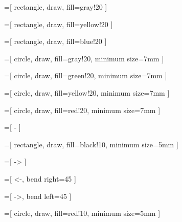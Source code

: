 
=[
	rectangle,
	draw,
	fill=gray!20
]

=[
	rectangle,
	draw,
	fill=yellow!20
]

=[
	rectangle,
	draw,
	fill=blue!20
]

=[
	circle,
	draw,
	fill=gray!20,
	minimum size=7mm
]

=[
	circle,
	draw,
	fill=green!20,
	minimum size=7mm
]

=[
	circle,
	draw,
	fill=yellow!20,
	minimum size=7mm
]

=[
	circle,
	draw,
	fill=red!20,
	minimum size=7mm
]

=[
	-
]

=[
	rectangle,
	draw,
	fill=black!10,
	minimum size=5mm
]

=[
	->
]

=[
	<-,
	bend right=45
]

=[
	->,
	bend left=45
]

=[
	circle,
	draw,
	fill=red!10,
	minimum size=5mm
]

\newcommand{\atomlegend}[2]{
	\node [rectangle,draw,fill=blue!20,minimum width=0.8cm] (body) at(#1,#2) {};
	\node [] (bodyLabel)							at(#1+1.4,#2)			{corps};
	\node [rectangle,draw,fill=yellow!20,minimum width=0.8cm] (head) at(#1,#2-0.5) {};
	\node [] (headLabel)							at(#1+1.4,#2-0.5)				{tête};
	\node [rectangle,draw,fill=green!20,minimum width=0.8cm] (fr) at(#1,#2-1) {};
	\node [] (frLabel)							at(#1+1.4,#2-1)				{frontière};
}

\newcommand{\lightatomlegend}[2]{
	\node [rectangle,draw,fill=blue!20,minimum width=0.8cm] (body) at(#1,#2) {};
	\node [] (bodyLabel)							at(#1+1.4,#2)			{corps};
	\node [rectangle,draw,fill=yellow!20,minimum width=0.8cm] (head) at(#1,#2-0.5) {};
	\node [] (headLabel)							at(#1+1.4,#2-0.5)				{tête};
}



